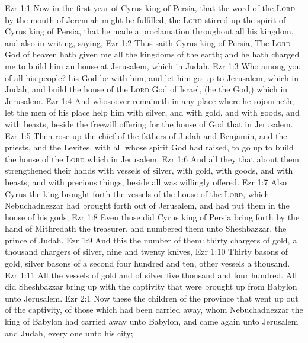 \vs Ezr 1:1 Now in the first year of Cyrus king of Persia, that the word of the \textsc{Lord} by the mouth of Jeremiah might be fulfilled, the \textsc{Lord} stirred up the spirit of Cyrus king of Persia, that he made a proclamation throughout all his kingdom, and  also in writing, saying,
\vs Ezr 1:2 Thus saith Cyrus king of Persia, The \textsc{Lord} God of heaven hath given me all the kingdoms of the earth; and he hath charged me to build him an house at Jerusalem, which  in Judah.
\vs Ezr 1:3 Who  among you of all his people? his God be with him, and let him go up to Jerusalem, which  in Judah, and build the house of the \textsc{Lord} God of Israel, (he  the God,) which  in Jerusalem.
\vs Ezr 1:4 And whosoever remaineth in any place where he sojourneth, let the men of his place help him with silver, and with gold, and with goods, and with beasts, beside the freewill offering for the house of God that  in Jerusalem.
\vs Ezr 1:5 Then rose up the chief of the fathers of Judah and Benjamin, and the priests, and the Levites, with all  whose spirit God had raised, to go up to build the house of the \textsc{Lord} which  in Jerusalem.
\vs Ezr 1:6 And all they that  about them strengthened their hands with vessels of silver, with gold, with goods, and with beasts, and with precious things, beside all  was willingly offered.
\vs Ezr 1:7 Also Cyrus the king brought forth the vessels of the house of the \textsc{Lord}, which Nebuchadnezzar had brought forth out of Jerusalem, and had put them in the house of his gods;
\vs Ezr 1:8 Even those did Cyrus king of Persia bring forth by the hand of Mithredath the treasurer, and numbered them unto Sheshbazzar, the prince of Judah.
\vs Ezr 1:9 And this  the number of them: thirty chargers of gold, a thousand chargers of silver, nine and twenty knives,
\vs Ezr 1:10 Thirty basons of gold, silver basons of a second  four hundred and ten,  other vessels a thousand.
\vs Ezr 1:11 All the vessels of gold and of silver  five thousand and four hundred. All  did Sheshbazzar bring up with  the captivity that were brought up from Babylon unto Jerusalem.
\vs Ezr 2:1 Now these  the children of the province that went up out of the captivity, of those which had been carried away, whom Nebuchadnezzar the king of Babylon had carried away unto Babylon, and came again unto Jerusalem and Judah, every one unto his city;
